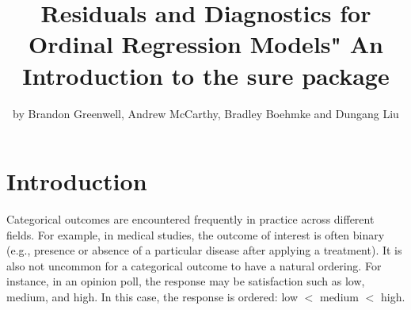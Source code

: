 \title{Residuals and Diagnostics for Ordinal Regression Models" An Introduction to the sure package}
\author{by Brandon Greenwell, Andrew McCarthy, Bradley Boehmke and Dungang Liu}

\maketitle



\section{Introduction}

Categorical outcomes are encountered frequently in practice across different fields. For example, in medical studies, the outcome of interest is often binary (e.g., presence or absence of a particular disease after applying a treatment). It is also not uncommon for a categorical outcome to have a natural ordering. For instance, in an opinion poll, the response may be satisfaction such as low, medium, and high. In this case, the response is ordered: low $<$ medium $<$ high.



